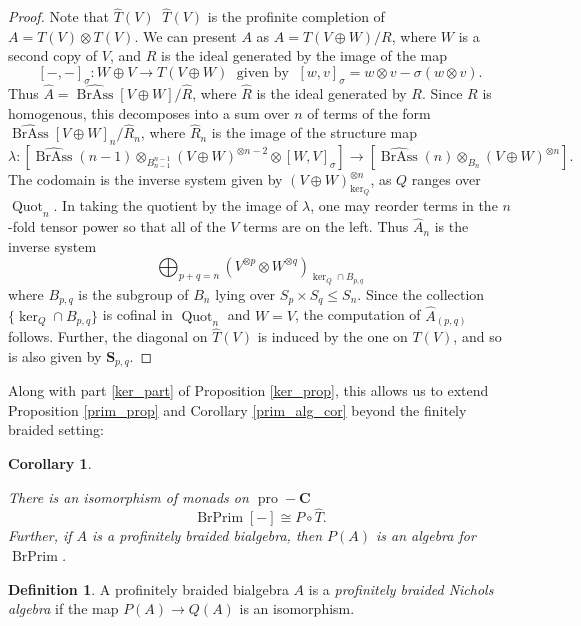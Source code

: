 \documentclass[12pt]{article}
\DeclareMathOperator{\Quot}{Quot}
\DeclareMathOperator{\pro}{pro}
\DeclareMathOperator{\BrAss}{BrAss}
\DeclareMathOperator{\BrPrim}{BrPrim}
\DeclareMathOperator{\hattimes}{\widehat{\otimes}}
\newcommand{\Ahat}{\widehat{A}}
\newcommand{\BrAsshat}{\widehat{\BrAss}} %
\newcommand{\That}{\widehat{T}}
\newcommand{\Rhat}{\widehat{R}}
\newcommand{\bC} {\mathbf{C}}
\newcommand{\proC}{\pro\!-\bC}
\newcommand{\bS} {\mathbf{S}}
\theoremstyle{plain}
\newtheorem{cor}[thm]{Corollary}
\theoremstyle{definition}
\newtheorem{defn}[thm]{Definition}
\theoremstyle{remark}
\begin{document}
\begin{proof}

Note that $\That(V) \hattimes \That(V)$ is the profinite completion of $A = T(V) \otimes T(V)$.  We can present $A$ as $A = T(V \oplus W) / R$, where $W$ is a second copy of $V$, and $R$ is the ideal generated by the image of the map
%
$$[-,-]_{\sigma}: W \oplus V \to T(V \oplus W) \; \mbox{ given by } \; [w, v]_{\sigma} = w \otimes v - \sigma(w \otimes v).$$
%
Thus $\Ahat = \BrAsshat[V \oplus W] / \Rhat$, where $\Rhat$ is the ideal generated by $R$.  Since $R$ is homogenous, this decomposes into a sum over $n$ of terms of the form $\BrAsshat[V \oplus W]_n / \Rhat_n$, where $\Rhat_n$ is the image of the structure map 
%
$$\lambda: [\BrAsshat(n-1) \otimes_{B_{n-1}^{n-1}} (V \oplus W)^{\otimes n-2} \otimes [W, V]_{\sigma}] \to [\BrAsshat(n) \otimes_{B_n} (V \oplus W)^{\otimes n}].$$
%
The codomain is the inverse system given by $(V \oplus W)^{\otimes n}_{\ker_Q}$, as $Q$ ranges over $\Quot_n$.  In taking the quotient by the image of $\lambda$, one may reorder terms in the $n$-fold tensor power so that all of the $V$ terms are on the left.  Thus $\Ahat_n$ is the inverse system
%
$$\bigoplus_{p+q = n} (V^{\otimes p} \otimes W^{\otimes q})_{\ker_Q \cap B_{p, q}}$$
%
where $B_{p,q}$ is the subgroup of $B_n$ lying over $S_p \times S_q \leq S_n$.  Since the collection $\{\ker_Q \cap B_{p, q}\}$ is cofinal in $\Quot_n$ and $W = V$, the computation of $\Ahat_{(p,q)}$ follows.  Further, the diagonal on $\That(V)$ is induced by the one on $T(V)$, and so is also given by $\bS_{p,q}$.

\end{proof}

Along with part \ref{ker_part} of Proposition \ref{ker_prop}, this allows us to extend Proposition \ref{prim_prop} and Corollary \ref{prim_alg_cor} beyond the finitely braided setting: 

\begin{cor} \label{infinite_prim_prop}

There is an isomorphism of monads on $\proC$
%
$$\BrPrim[-] \cong P \circ \That.$$
%
Further, if $A$ is a profinitely braided bialgebra, then $P(A)$ is an algebra for $\BrPrim$.

\end{cor}

\begin{defn}

A profinitely braided bialgebra $A$ is a \emph{profinitely braided Nichols algebra} if the map $P(A) \to Q(A)$ is an isomorphism.

\end{defn}
\end{document}

